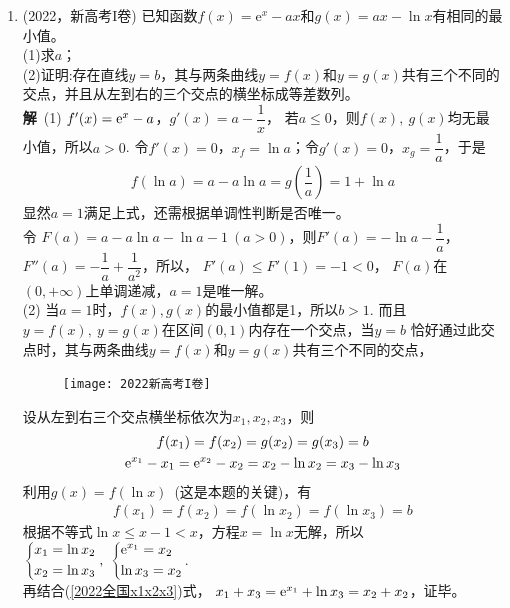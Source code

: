 \begin{enumerate}[label={【\textbf{例\thechapter.\arabic*}】},
 leftmargin=\inteval{\myenumleftmargin}pt,
 itemsep=\inteval{\myenumitempsep}pt,
 itemindent=\inteval{\myenumitemindent}pt]
\item \label{2022新高考I卷导数x1x2x3}(2022，新高考I卷)
已知函数$f(x)=\mathrm{e}^{x}-ax$和$g(x)=ax-\ln x$有相同的最小值。\\
(1)求$a$；\\
(2)证明:存在直线$y=b$，其与两条曲线$y=f(x)$和$y=g(x)$共有三个不同的交点，并且从左到右的三个交点的横坐标成等差数列。\\
\textbf{解}\ (1) $ f'(x)=\mathrm{e}^x-a $，$ g'(x)=a-\dfrac{1}{x} $，
若$ a\leq 0 $，则$ f(x),\ g(x) $均无最小值，所以$ a>0 $.
令$ f'(x)=0 $，$ x_f=\ln a $；令$ g'(x)=0 $，$ x_g=\dfrac{1}{a} $，于是
\begin{gather*}
    f(\ln a)=a-a\ln a=g\left(\dfrac{1}{a}\right)=1+\ln a
\end{gather*}
显然$ a=1 $满足上式，还需根据单调性判断是否唯一。\\ 令
$ F(a)=a-a\ln a-\ln a-1\ (a>0) $，则$ F'(a)=-\ln a-\dfrac{1}{a} $，
$ F''(a)=-\dfrac{1}{a}+\dfrac{1}{a^2} $，所以，
$ F'(a)\leq F'(1)=-1<0 $，
$ F(a) $在$ (0,+\infty) $上单调递减，$ a=1 $是唯一解。\\
(2) 当$ a=1 $时，$ f(x),g(x) $的最小值都是1，所以$ b>1 $.
而且$ y=f(x),\ y=g(x) $在区间$ (0,1) $内存在一个交点，当$ y=b $
恰好通过此交点时，其与两条曲线$y=f(x)$和$y=g(x)$共有三个不同的交点，
\begin{figure}[!ht]
    \centering
    \texttt{[image: 2022新高考I卷]}
\end{figure}
\noindent 设从左到右三个交点横坐标依次为$ x_1,x_2,x_3 $，则
\begin{gather}
    f(x_1)=f(x_2)=g(x_2)=g(x_3)=b \nonumber \\
    \mathrm{e}^{x_1}-x_1=\mathrm{e}^{x_2}-x_2=x_2-\ln x_2=x_3-\ln x_3 
    \label{2022全国x1x2x3}
\end{gather}
利用$ g(x)=f(\ln x) $\ (这是本题的关键)，有
\begin{gather*}
    f(x_1)=f(x_2)=f(\ln x_2)=f(\ln x_3)=b
\end{gather*}
根据不等式$ \ln x\leq x-1<x $，方程$ x=\ln x $无解，所以
$ \begin{dcases}
    x_1=\ln x_2 \\
    x_2=\ln x_3
\end{dcases},\ 
\begin{dcases}
    \e^{x_1}=x_2 \\
    \ln x_3=x_2
\end{dcases}$. \\再结合(\ref{2022全国x1x2x3})式，
$ x_1+x_3=\mathrm{e}^{x_1}+\ln x_3=x_2+x_2 $，证毕。


\end{enumerate}
